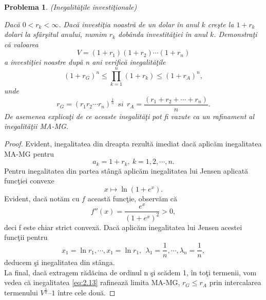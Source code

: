 \documentclass[a4paper,12pt,oneside]{report}
\newtheorem{problem}{Problema}
\begin{document}
\begin{problem} (Inegalit\u{a}\c{t}ile investi\c{t}ionale)

Dac\u{a} \(0< r_{k} < \infty\). Dac\u{a} investi\c{t}ia noastr\u{a} de un dolar \^{i}n anul \(k\) cre\c{s}te la \(1 +  r_{k}\) dolari la sf\^{a}r\c{s}itul anului, numim \(r_{k}\) dob\^{a}nda investit\u{a}\c{t}iei \^{i}n anul \(k\). Demonstra\c{t}i c\u{a} valoarea
\begin{displaymath}
  V = \left ( 1 + r_{1} \right )\left ( 1 + r_{2} \right )\cdots \left ( 1 + r_{n} \right )
\end{displaymath}
a investi\c{t}iei noastre dup\u{a} n ani verific\u{a} inegalit\u{a}\c{t}ile
\begin{displaymath}
  \left ( 1 + r_{G} \right )^{n} \leq \prod_{k = 1}^{n} \left ( 1 + r_{k} \right )\leq \left ( 1 + r_{A} \right )^{n}, \label{eq:2.13} \tag{2.13}
\end{displaymath}
unde
\begin{displaymath}
  r_{G} = \left ( r_{1}r_{2} \cdots r_{n}\right )^{\frac{1}{n}}~~ si~~ r_{A} = \frac{\left ( r_{1} + r_{2} +  \cdots+ r_{n}\right )}{n}.
\end{displaymath}
De asemenea explica\c{t}i de ce aceaste inegalit\u{a}\c{t}i  pot fi vazute ca un rafinament al inegalit\u{a}\c{t}ii MA-MG.
\end{problem}
\begin{proof}
Evident, inegalitatea din dreapta rezult\u{a} imediat dac\u{a} aplic\u{a}m inegalitatea MA-MG pentru
\begin{displaymath}
  a_{k} = 1 + r_{k},~ k =1,2,\cdots, n.
\end{displaymath}
Pentru inegalitatea din partea st\^{a}ng\u{a} aplic\u{a}m inegalitatea lui Jensen aplicat\u{a} func\c{t}iei convexe
\[x \mapsto \ln\left ( 1 + e^{x} \right ).\]
Evident, dac\u{a} not\u{a}m cu $f$ aceast\u{a} func\c{t}ie, observ\u{a}m c\u{a}
\[
f''(x)=\frac{e^x}{(1+e^x)^2}>0,
\]
deci f este chiar strict convex\u{a}. Dac\u{a} aplic\u{a}m inegalitatea lui Jensen acestei func\c{t}ii pentru
\[
x_1=\ln r_1,\cdots, x_1=\ln r_1,~~\lambda_1=\frac{1}{n},\cdots, \lambda_n=\frac{1}{n},
\]
deducem \c{s}i inegalitatea din st\^{a}nga.\\
La final, dac\u{a} extragem r\u{a}d\u{a}cina de ordinul n \c{s}i sc\u{a}dem 1, \^{i}n to\c{t}i termenii, vom vedea c\u{a} inegalitatea \ref{eq:2.13} rafineaz\u{a} limita MA-MG,  \(r_{G} \leq r_{A}\) prin intercalarea termenului \(V^{\frac{1}{n}} – 1\) \^{i}ntre cele dou\u{a}.
\end{proof}
\end{document}
